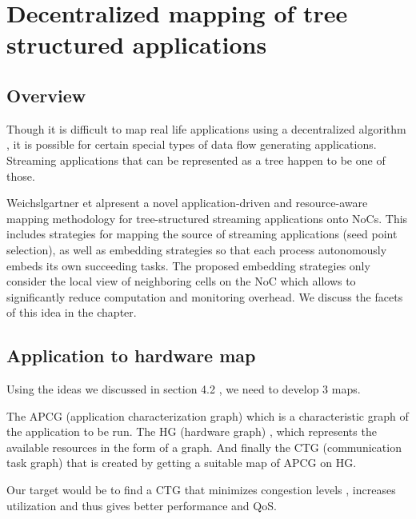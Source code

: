 
\lhead[\chaptername~\thechapter]{\rightmark}


\rhead[\leftmark]{}


\lfoot[\thepage]{}


\cfoot{}


\rfoot[]{\thepage}


\chapter{Decentralized mapping of tree structured applications}


\section{Overview}

Though it is difficult to map real life applications using a decentralized
algorithm , it is possible for certain special types of data flow
generating applications. Streaming applications that can be represented
as a tree happen to be one of those. 

Weichslgartner et al\cite{Weichslgartner:2011:DDM:1999946.1999979}present
a novel application-driven and resource-aware mapping methodology
for tree-structured streaming applications onto NoCs. This includes
strategies for mapping the source of streaming applications (seed
point selection), as well as embedding strategies so that each process
autonomously embeds its own succeeding tasks. The proposed embedding
strategies only consider the local view of neighboring cells on the
NoC which allows to significantly reduce computation and monitoring
overhead. We discuss the facets of this idea in the chapter.


\section{Application to hardware map}

Using the ideas we discussed in section 4.2 , we need to develop 3
maps.

The APCG (application characterization graph) which is a characteristic
graph of the application to be run. The HG (hardware graph) , which
represents the available resources in the form of a graph. And finally
the CTG (communication task graph) that is created by getting a suitable
map of APCG on HG.

Our target would be to find a CTG that minimizes congestion levels
, increases utilization and thus gives better performance and QoS.

